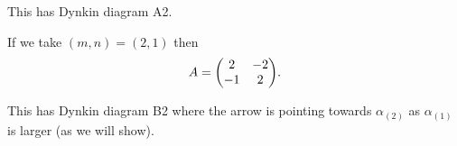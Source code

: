 This has Dynkin diagram \dynkin A2.

If we take $\left( m,n \right) = \left( 2,1 \right) $ then
\begin{align}
    A = \mqty( 2 & -2 \\ -1 & 2)
.\end{align}

This has Dynkin diagram \dynkin B2 where the arrow is pointing towards $\alpha_{\left( 2 \right) }$ as $\alpha_{\left( 1 \right) }$ is larger (as we will show).



